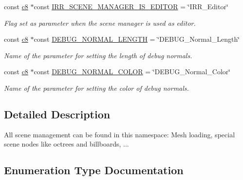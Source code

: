 \begin{DoxyCompactItemize}
const \hyperlink{namespaceirr_a9395eaea339bcb546b319e9c96bf7410}{c8} $\ast$const \hyperlink{namespaceirr_1_1scene_a7a3f4a75d85bd2b3f6bc4dd58f3ce585}{I\+R\+R\+\_\+\+S\+C\+E\+N\+E\+\_\+\+M\+A\+N\+A\+G\+E\+R\+\_\+\+I\+S\+\_\+\+E\+D\+I\+T\+OR} = \char`\"{}I\+R\+R\+\_\+\+Editor\char`\"{}
\begin{DoxyCompactList}\small\item\em Flag set as parameter when the scene manager is used as editor. \end{DoxyCompactList}\item 
const \hyperlink{namespaceirr_a9395eaea339bcb546b319e9c96bf7410}{c8} $\ast$const \hyperlink{namespaceirr_1_1scene_a19153395855d08302b70dcfa9247eb51}{D\+E\+B\+U\+G\+\_\+\+N\+O\+R\+M\+A\+L\+\_\+\+L\+E\+N\+G\+TH} = \char`\"{}D\+E\+B\+U\+G\+\_\+\+Normal\+\_\+\+Length\char`\"{}
\begin{DoxyCompactList}\small\item\em Name of the parameter for setting the length of debug normals. \end{DoxyCompactList}\item 
const \hyperlink{namespaceirr_a9395eaea339bcb546b319e9c96bf7410}{c8} $\ast$const \hyperlink{namespaceirr_1_1scene_a767a12984dbf7a4f0917993d748d1350}{D\+E\+B\+U\+G\+\_\+\+N\+O\+R\+M\+A\+L\+\_\+\+C\+O\+L\+OR} = \char`\"{}D\+E\+B\+U\+G\+\_\+\+Normal\+\_\+\+Color\char`\"{}
\begin{DoxyCompactList}\small\item\em Name of the parameter for setting the color of debug normals. \end{DoxyCompactList}\end{DoxyCompactItemize}


\subsection{Detailed Description}
All scene management can be found in this namespace\+: Mesh loading, special scene nodes like octrees and billboards, ... 

\subsection{Enumeration Type Documentation}
\mbox{\label{namespaceirr_1_1scene_a2fc85a64604521ca063f1881b5dd1c61}} 
